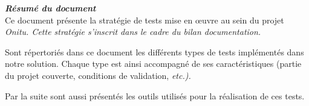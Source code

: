 \thispagestyle{empty}
\vspace*{10mm}

\textbf{\emph{\textcolor{epiBlue}{\large{Résumé du document} } } }\\

Ce document présente la stratégie de tests mise en œuvre au sein du projet \em{Onitu}. Cette stratégie s'inscrit dans le cadre du bilan documentation.

Sont répertoriés dans ce document les différents types de tests implémentés dans notre solution. Chaque type est ainsi accompagné de ses caractéristiques (partie du projet couverte, conditions de validation, \em{etc.}).

Par la suite sont aussi présentés les outils utilisés pour la réalisation de ces tests.

\clearpage
